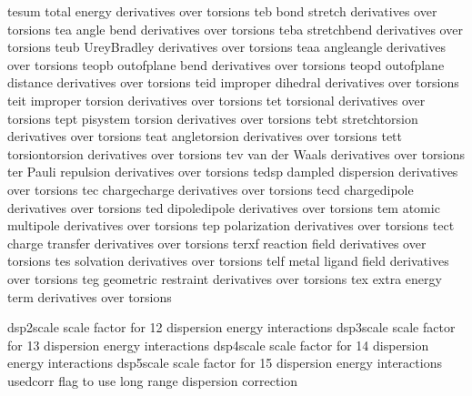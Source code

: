 \documentclass[letterpaper,11pt,english]{sphinxmanual}
\begin{document}
\sphinxAtStartPar
{}

\begin{sphinxVerbatim}[commandchars=\\\{\}]
tesum           total energy derivatives over torsions
teb             bond stretch derivatives over torsions
tea             angle bend derivatives over torsions
teba            stretch\PYGZhy{}bend derivatives over torsions
teub            Urey\PYGZhy{}Bradley derivatives over torsions
teaa            angle\PYGZhy{}angle derivatives over torsions
teopb           out\PYGZhy{}of\PYGZhy{}plane bend derivatives over torsions
teopd           out\PYGZhy{}of\PYGZhy{}plane distance derivatives over torsions
teid            improper dihedral derivatives over torsions
teit            improper torsion derivatives over torsions
tet             torsional derivatives over torsions
tept            pi\PYGZhy{}system torsion derivatives over torsions
tebt            stretch\PYGZhy{}torsion derivatives over torsions
teat            angle\PYGZhy{}torsion derivatives over torsions
tett            torsion\PYGZhy{}torsion derivatives over torsions
tev             van der Waals derivatives over torsions
ter             Pauli repulsion derivatives over torsions
tedsp           dampled dispersion derivatives over torsions
tec             charge\PYGZhy{}charge derivatives over torsions
tecd            charge\PYGZhy{}dipole derivatives over torsions
ted             dipole\PYGZhy{}dipole derivatives over torsions
tem             atomic multipole derivatives over torsions
tep             polarization derivatives over torsions
tect            charge transfer derivatives over torsions
terxf           reaction field derivatives over torsions
tes             solvation derivatives over torsions
telf            metal ligand field derivatives over torsions
teg             geometric restraint derivatives over torsions
tex             extra energy term derivatives over torsions
\end{sphinxVerbatim}

\sphinxAtStartPar
{}

\begin{sphinxVerbatim}[commandchars=\\\{\}]
dsp2scale       scale factor for 1\PYGZhy{}2 dispersion energy interactions
dsp3scale       scale factor for 1\PYGZhy{}3 dispersion energy interactions
dsp4scale       scale factor for 1\PYGZhy{}4 dispersion energy interactions
dsp5scale       scale factor for 1\PYGZhy{}5 dispersion energy interactions
use\PYGZus{}dcorr       flag to use long range dispersion correction
\end{sphinxVerbatim}
\end{document}
